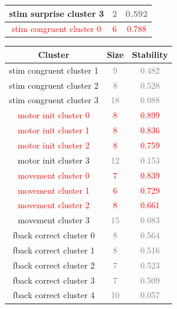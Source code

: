\begin{table}[ht]
\begin{minipage}{0.48\textwidth}
\begin{tabular}{c|c|c}
stim surprise cluster 3 & \textcolor{gray}{2} & \textcolor{gray}{0.592} \\ \hline
\textcolor{red}{stim congruent cluster 0} & \textcolor{red}{6} & \textcolor{red}{0.788} \\ \hline
\end{tabular}
\end{minipage}
\hfill
\begin{minipage}{0.48\textwidth}
\begin{tabular}{c|c|c}
\hline
\textbf{Cluster} & \textbf{Size} & \textbf{Stability} \\ \hline
stim congruent cluster 1 & \textcolor{gray}{9} & \textcolor{gray}{0.482} \\ \hline
stim congruent cluster 2 & \textcolor{gray}{8} & \textcolor{gray}{0.528} \\ \hline
stim congruent cluster 3 & \textcolor{gray}{18} & \textcolor{gray}{0.088} \\ \hline
\textcolor{red}{motor init cluster 0} & \textcolor{red}{8} & \textcolor{red}{0.899} \\ \hline
\textcolor{red}{motor init cluster 1} & \textcolor{red}{8} & \textcolor{red}{0.836} \\ \hline
\textcolor{red}{motor init cluster 2} & \textcolor{red}{8} & \textcolor{red}{0.759} \\ \hline
motor init cluster 3 & \textcolor{gray}{12} & \textcolor{gray}{0.153} \\ \hline
\textcolor{red}{movement cluster 0} & \textcolor{red}{7} & \textcolor{red}{0.839} \\ \hline
\textcolor{red}{movement cluster 1} & \textcolor{red}{6} & \textcolor{red}{0.729} \\ \hline
\textcolor{red}{movement cluster 2} & \textcolor{red}{8} & \textcolor{red}{0.661} \\ \hline
movement cluster 3 & \textcolor{gray}{15} & \textcolor{gray}{0.083} \\ \hline
fback correct cluster 0 & \textcolor{gray}{8} & \textcolor{gray}{0.564} \\ \hline
fback correct cluster 1 & \textcolor{gray}{8} & \textcolor{gray}{0.516} \\ \hline
fback correct cluster 2 & \textcolor{gray}{7} & \textcolor{gray}{0.523} \\ \hline
fback correct cluster 3 & \textcolor{gray}{7} & \textcolor{gray}{0.509} \\ \hline
fback correct cluster 4 & \textcolor{gray}{10} & \textcolor{gray}{0.057} \\ \hline

\end{tabular}
\end{minipage}
\end{table}
